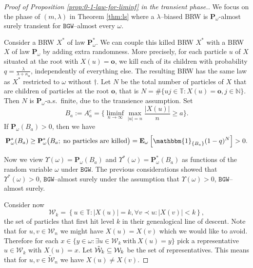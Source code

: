 \documentclass[11 pt]{article}
\theoremstyle{definition}
\numberwithin{equation}{section}
\newcommand{\NN}{\mathbb{N}}
\newcommand{\TT}{\mathbb{T}} %
\newcommand{\ind}[1]{\mathbbm{1}_{\left\{ #1 \right\} } } %
\newcommand{\rt}{\mathbf{o}} %
\newcommand{\Pw}{\mathbf{P}_{\omega}} %
\begin{document}
\begin{proof}[Proof of Proposition \ref{prop:0-1-law-for-liminf} in the transient phase.] 
	We focus on the phase of $(m,\lambda)$ in Theorem \ref{thm:ls} where a $\lambda$--biased BRW is $\Pw$-almost surely transient for 
	$\mathtt{BGW}$--almost every $\omega$.  
	
	Consider a BRW $X^*$ of law $\mathbf{P}^*_{\omega}$. 
	We can couple this killed BRW $X^*$ with a BRW $X$ of law $\mathbf{P}_{\omega}$ by adding extra randomness. More precisely, for each particle $u$ of $X$ situated at the root with $X(u) = \rt$, we kill each of its children with probability $q = \frac{\lambda}{\lambda+ \kappa_{\rt}}$, independently of everything else. The resulting BRW has the same law as $X^*$ restricted to $\omega$ without $\dagger$. 
	 Let $N$ be the total number of particles of $X$ that are children of particles at the root $\rt$, that is $N = \#\{uj\in \mathbb{T}\colon X(u) =\rt, j\in \NN\}$. Then $N$ is $\mathbf{P}_{\omega}$-a.s.\ finite, due to the transience assumption. 	 
	 Set  
	 \begin{equation*}
	 		 B_a:= A_a^c= \Big\{ \liminf_{n \to \infty} \max_{\vert u \vert =n} \frac{\vert X(u) \vert}{n} \geq
	 	a\Big\}.
	 \end{equation*}
	 If $	\mathbf{P}_{\omega} \left(B_a \right)>0$, then we have  
		\begin{equation*}
		    		\mathbf{P}^*_{\omega}(B_a )
		    	\geq	\mathbf{P}^*_{\omega} \big(	B_a;\; \text{no particles are killed} \big)
				=
				\mathbf{E}_{\omega} \left[\ind{	B_a} (1-q)^{N}
				\right]  
				>0. 
			\end{equation*}
		
			 Now we view $\Upsilon(\omega) = \mathbf{P}_\omega \left( B_a \right)$ and $\Upsilon^*(\omega) = \mathbf{P}_{\omega}^* \left(B_a \right)$ as functions of the random variable $\omega$ under $\mathtt{BGW}$. 
	The previous considerations showed that $\Upsilon^*(\omega)>0$, $\mathtt{BGW}$--almost surely under the assumption that $\Upsilon(\omega)>0$, $\mathtt{BGW}$--almost surely. 

	
			Consider now 
	\begin{equation}
    		\mathcal{W}_k = \left\{ u \in \TT: \vert X(u) \vert=k, \forall v \prec u: \vert X(v) \vert < k \right\},
	\end{equation}
	the set of particles that first hit level $k$ in their genealogical line of descent. Note that for $u,v \in
	 \mathcal{W}_n$ we might have $X(u) = X(v)$ which we would like to avoid. Therefore for each $x\in\{y\in
	 \omega: \exists u\in \mathcal{W}_k \ \text{with} \ X(u)=y\}$ pick a representative $u\in \mathcal{W}_k$ with
	 $X(u)=x$. Let $\Tilde{\mathcal{W}}_k \subseteq \mathcal{W}_k$ be the set of representatives. 
	This means that for $u,v\in \widetilde{\mathcal{W}}_n$ we have $X(u) \neq X(v)$.


\end{proof}
\end{document}
